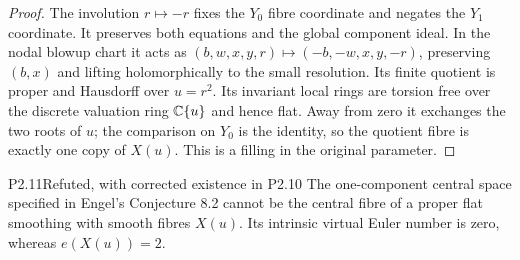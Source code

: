 \begin{proof}
The involution $r\mapsto-r$ fixes the $Y_0$ fibre coordinate and negates the $Y_1$ coordinate. It preserves both equations and the global component ideal. In the nodal blowup chart it acts as $(b,w,x,y,r)\mapsto(-b,-w,x,y,-r)$, preserving $(b,x)$ and lifting holomorphically to the small resolution. Its finite quotient is proper and Hausdorff over $u=r^2$. Its invariant local rings are torsion free over the discrete valuation ring $\mathbb C\{u\}$ and hence flat. Away from zero it exchanges the two roots of $u$; the comparison on $Y_0$ is the identity, so the quotient fibre is exactly one copy of $X(u)$. This is a filling in the original parameter.
\end{proof}

\begin{statement}{P2.11}{Refuted, with corrected existence in P2.10}
The one-component central space specified in Engel's Conjecture 8.2 cannot be the central fibre of a proper flat smoothing with smooth fibres $X(u)$. Its intrinsic virtual Euler number is zero, whereas $e(X(u))=2$.
\end{statement}
